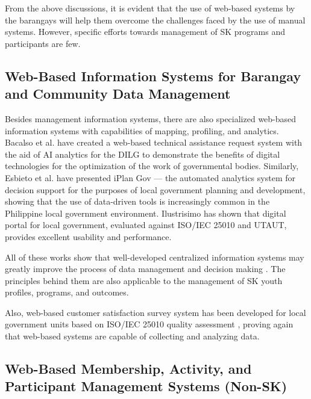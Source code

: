 \hspace*{\parindent}From the above discussions, it is evident that the use of web-based systems by the barangays will help them overcome the challenges faced by the use of manual systems. However, specific efforts towards management of SK programs and participants are few.
\vspace{5mm}

\subsection{Web-Based Information Systems for Barangay and Community Data Management}

\hspace*{\parindent}Besides management information systems, there are also specialized web-based information systems with capabilities of mapping, profiling, and analytics. Bacalso et al. \cite{H} have created a web-based technical assistance request system with the aid of AI analytics for the DILG to demonstrate the benefits of digital technologies for the optimization of the work of governmental bodies. Similarly, Esbieto et al. \cite{P} have presented iPlan Gov --- the automated analytics system for decision support for the purposes of local government planning and development, showing that the use of data-driven tools is increasingly common in the Philippine local government environment. Ilustrisimo \cite{X} has shown that digital portal for local government, evaluated against ISO/IEC 25010 and UTAUT, provides excellent usability and performance.
\vspace{5mm}

\hspace*{\parindent}All of these works show that well-developed centralized information systems may greatly improve the process of data management and decision making \cite{A,D,V}. The principles behind them are also applicable to the management of SK youth profiles, programs, and outcomes.
\vspace{5mm}

\hspace*{\parindent}Also, web-based customer satisfaction survey system has been developed for local government units based on ISO/IEC 25010 quality assessment \cite{AL}, proving again that web-based systems are capable of collecting and analyzing data.
\vspace{5mm}

\subsection{Web-Based Membership, Activity, and Participant Management Systems (Non-SK)}

